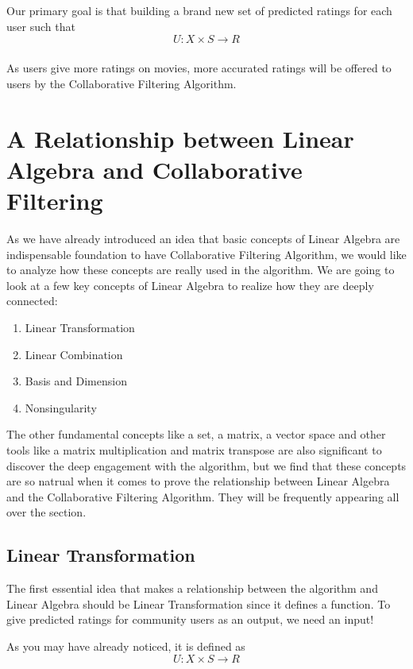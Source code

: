 \documentclass[paper=a4, fontsize=12pt]{scrartcl} %
\numberwithin{equation}{section} %
\numberwithin{figure}{section} %
\numberwithin{table}{section} %
\newcommand{\arrow}[1] {\xrightarrow[]{\text{#1}}}
\begin{document}
	Our primary goal is that building a brand new set of predicted ratings for
  each user such that 
  \[
    U : X \times S \arrow{} R
  \]

  As users give more ratings on movies, more accurated ratings will be offered
  to users by the Collaborative Filtering Algorithm.

  \pagebreak

  \section{A Relationship between Linear Algebra and Collaborative Filtering}

  As we have already introduced an idea that basic concepts of Linear Algebra are
  indispensable foundation to have Collaborative Filtering Algorithm, we would
  like to analyze how these concepts are really used in the algorithm. We are
  going to look at a few key concepts of Linear Algebra to realize how they are
  deeply connected:
  \begin{enumerate}
  \item Linear Transformation
  \item Linear Combination
  \item Basis and Dimension
  \item Nonsingularity
  \end{enumerate}

  The other fundamental concepts like a set, a matrix, a vector space and other
  tools like a matrix multiplication and matrix transpose are also significant
  to discover the deep engagement with the algorithm, but we find that these
  concepts are so natrual when it comes to prove the relationship between Linear
  Algebra and the Collaborative Filtering Algorithm. They will be frequently
  appearing all over the section. \\

  \subsection{Linear Transformation}

  The first essential idea that makes a relationship between the algorithm and
  Linear Algebra should be Linear Transformation since it defines a function. To
  give predicted ratings for community users as an output, we need an input!

  As you may have already noticed, it is defined as
  \[
    U : X \times S \arrow{} R
  \]
\end{document}

